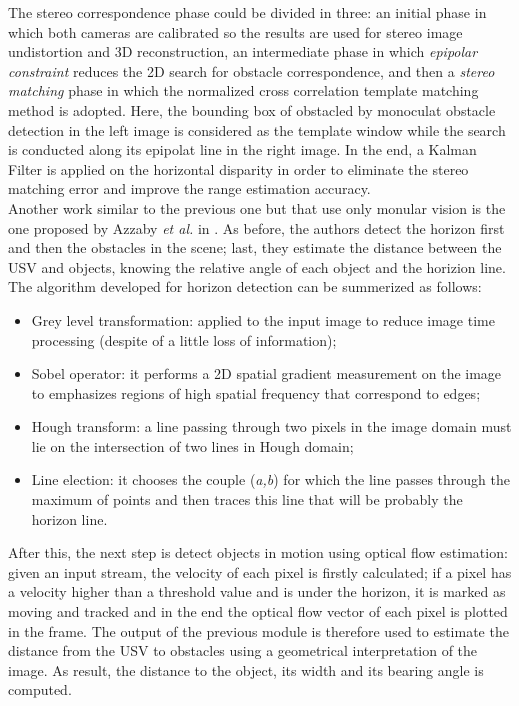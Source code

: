 \documentclass[journal]{IEEEtran}
\begin{document}
\indent The stereo correspondence phase could be divided in three: an initial phase in which both cameras are calibrated so the results are used for stereo image undistortion and 3D reconstruction, an intermediate phase in which \textit{epipolar constraint} reduces the 2D search for obstacle correspondence, and then a \textit{stereo matching} phase in which the normalized cross correlation template matching method is adopted. Here, the bounding box of obstacled by monoculat obstacle detection in the left image is considered as the template window while the search is conducted along its epipolat line in the right image. In the end, a Kalman Filter is applied on the horizontal disparity in order to eliminate the stereo matching error and improve the range estimation accuracy.\\
\indent Another work similar to the previous one but that use only monular vision is the one proposed by Azzaby \textit{et al.} in \cite{Azzabi}. As before, the authors detect the horizon first and then the obstacles in the scene; last, they estimate the distance between the USV and objects, knowing the relative angle of each object and the horizion line. The algorithm developed for horizon detection can be summerized as follows:
\begin{itemize}
\item Grey level transformation: applied to the input image to reduce image time processing (despite of a little loss of information);
\item Sobel operator: it performs a 2D spatial gradient measurement on the image to emphasizes regions of high spatial frequency that correspond to edges;
\item Hough transform: a line passing through two pixels in the image domain must lie on the intersection of two lines in Hough domain;
\item Line election: it chooses the couple (\textit{a,b}) for which the line passes through the maximum of points and then traces this line that will be probably the horizon line.
\end{itemize}
\indent After this, the next step is detect objects in motion using optical flow estimation: given an input stream, the velocity of each pixel is firstly calculated; if a pixel has a velocity higher than a threshold value and is under the horizon, it is marked as moving and tracked and in the end the optical flow vector of each pixel is plotted in the frame.
\indent The output of the previous module is therefore used to estimate the distance from the USV to obstacles using a geometrical interpretation of the image. As result, the distance to the object, its width and its bearing angle is computed.
\end{document}
